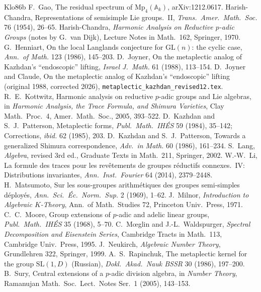 \documentclass[12pt]{article}
\newcommand{\A}{\mathbb{A}}
\newcommand{\GL}{\mathrm{GL}}
\theoremstyle{plain}
\theoremstyle{definition}
\begin{document}
\begin{thebibliography}{Klo86b}
 F.~Gao, The residual spectrum of $\mathrm{Mp}_4(\A_k)$, arXiv:1212.0617.
 Harish-Chandra, Representations of semisimple Lie groups.\ II, \emph{Trans.\ Amer.\ Math.\ Soc.} 76 (1954), 26--65.
 Harish-Chandra, \emph{Harmonic Analysis on Reductive $p$-adic Groups} (notes by G.~van Dijk), Lecture Notes in Math.\ 162, Springer, 1970.
 G.~Henniart, On the local Langlands conjecture for $\GL(n)$: the cyclic case, \emph{Ann.\ of Math.} 123 (1986), 145--203.
 D.~Joyner, On the metaplectic analog of Kazhdan's ``endoscopic'' lifting, \emph{Israel J.\ Math.} 61 (1988), 113--154.
 D.~Joyner and Claude, On the metaplectic analog of Kazhdan's ``endoscopic'' lifting (original 1988, corrected 2026), \texttt{metaplectic\_kazhdan\_revised12.tex}.
 R.~E.~Kottwitz, Harmonic analysis on reductive $p$-adic groups and Lie algebras, in \emph{Harmonic Analysis, the Trace Formula, and Shimura Varieties}, Clay Math.\ Proc.\ 4, Amer.\ Math.\ Soc., 2005, 393--522.
 D.~Kazhdan and S.~J.~Patterson, Metaplectic forms, \emph{Publ.\ Math.\ IH\'ES} 59 (1984), 35--142; Corrections, \emph{ibid.} 62 (1985), 203.
 D.~Kazhdan and S.~J.~Patterson, Towards a generalized Shimura correspondence, \emph{Adv.\ in Math.} 60 (1986), 161--234.
 S.~Lang, \emph{Algebra}, revised 3rd ed., Graduate Texts in Math.\ 211, Springer, 2002.
 W.-W.~Li, La formule des traces pour les rev\^etements de groupes r\'eductifs connexes.\ IV: Distributions invariantes, \emph{Ann.\ Inst.\ Fourier} 64 (2014), 2379--2448.
 H.~Matsumoto, Sur les sous-groupes arithm\'etiques des groupes semi-simples d\'eploy\'es, \emph{Ann.\ Sci.\ \'Ec.\ Norm.\ Sup.} 2 (1969), 1--62.
 J.~Milnor, \emph{Introduction to Algebraic $K$-Theory}, Ann.\ of Math.\ Studies 72, Princeton Univ.\ Press, 1971.
 C.~C.~Moore, Group extensions of $p$-adic and adelic linear groups, \emph{Publ.\ Math.\ IH\'ES} 35 (1968), 5--70.
 C.~M\oe glin and J.-L.~Waldspurger, \emph{Spectral Decomposition and Eisenstein Series}, Cambridge Tracts in Math.\ 113, Cambridge Univ.\ Press, 1995.
 J.~Neukirch, \emph{Algebraic Number Theory}, Grundlehren 322, Springer, 1999.
 A.~S.~Rapinchuk, The metaplectic kernel for the group $\mathrm{SL}(1,D)$ (Russian), \emph{Dokl.\ Akad.\ Nauk BSSR} 30 (1986), 197--200.
 B.~Sury, Central extensions of a $p$-adic division algebra, in \emph{Number Theory}, Ramanujan Math.\ Soc.\ Lect.\ Notes Ser.\ 1 (2005), 143--153.

\end{thebibliography}
\end{document}
